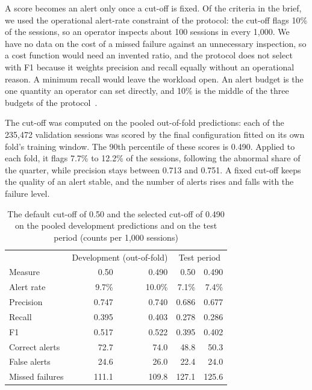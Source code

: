 \documentclass[12pt,a4paper,openany]{report}
\begin{document}
A score becomes an alert only once a cut-off is fixed. Of the criteria in the brief, we used the operational
alert-rate constraint of the protocol: the cut-off flags 10\% of the sessions, so an operator inspects about 100
sessions in every 1,000. We have no data on the cost of a missed failure against an unnecessary inspection, so a
cost function would need an invented ratio, and the protocol does not select with F1 because it weights
precision and recall equally without an operational reason. A minimum recall would leave the workload open. An
alert budget is the one quantity an operator can set directly, and 10\% is the middle of the three budgets of the
protocol~\cite{mindd_lab_eval}.

The cut-off was computed on the pooled out-of-fold predictions: each of the 235,472 validation sessions was scored
by the final configuration fitted on its own fold's training window. The 90th percentile of these scores is 0.490.
Applied to each fold, it flags 7.7\% to 12.2\% of the sessions, following the abnormal share of the quarter, while
precision stays between 0.713 and 0.751. A fixed cut-off keeps the quality of an alert stable, and the number of
alerts rises and falls with the failure level.

\begin{table}[!htb]
  \centering\small
  \caption[The default and the selected cut-off]{The default cut-off of 0.50 and the selected cut-off of 0.490 on the pooled development predictions and on the test period (counts per 1,000 sessions)}
  \label{tab:optim-cutoff}
  \begin{tabular*}{\textwidth}{@{\extracolsep{\fill}}lrrrr}
    \toprule
    & \multicolumn{2}{c}{Development (out-of-fold)} & \multicolumn{2}{c}{Test period} \\
    Measure & 0.50 & 0.490 & 0.50 & 0.490 \\
    \midrule
    Alert rate      & 9.7\% & 10.0\% & 7.1\% & 7.4\% \\
    Precision       & 0.747 & 0.740 & 0.686 & 0.677 \\
    Recall          & 0.395 & 0.403 & 0.278 & 0.286 \\
    F1              & 0.517 & 0.522 & 0.395 & 0.402 \\
    Correct alerts  & 72.7  & 74.0  & 48.8  & 50.3 \\
    False alerts    & 24.6  & 26.0  & 22.4  & 24.0 \\
    Missed failures & 111.1 & 109.8 & 127.1 & 125.6 \\
    \bottomrule
  \end{tabular*}
\end{table}
\end{document}
